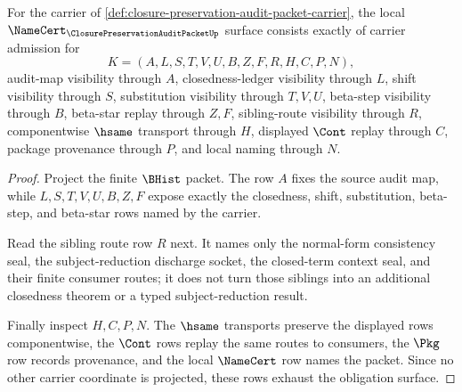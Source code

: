 \begin{theorem}
\label{thm:closure-preservation-audit-packet-namecert-obligations}
For the carrier of \autoref{def:closure-preservation-audit-packet-carrier}, the local $\NameCert_{\ClosurePreservationAuditPacketUp}$ surface consists exactly of carrier admission for
$$
K=(A,L,S,T,V,U,B,Z,F,R,H,C,P,N),
$$
audit-map visibility through $A$, closedness-ledger visibility through $L$, shift visibility through $S$, substitution visibility through $T,V,U$, beta-step visibility through $B$, beta-star replay through $Z,F$, sibling-route visibility through $R$, componentwise $\hsame$ transport through $H$, displayed $\Cont$ replay through $C$, package provenance through $P$, and local naming through $N$.
\end{theorem}
\begin{proof}
Project the finite $\BHist$ packet. The row $A$ fixes the source audit map, while $L,S,T,V,U,B,Z,F$ expose exactly the closedness, shift, substitution, beta-step, and beta-star rows named by the carrier.

Read the sibling route row $R$ next. It names only the normal-form consistency seal, the subject-reduction discharge socket, the closed-term context seal, and their finite consumer routes; it does not turn those siblings into an additional closedness theorem or a typed subject-reduction result.

Finally inspect $H,C,P,N$. The $\hsame$ transports preserve the displayed rows componentwise, the $\Cont$ rows replay the same routes to consumers, the $\Pkg$ row records provenance, and the local $\NameCert$ row names the packet. Since no other carrier coordinate is projected, these rows exhaust the obligation surface.
\end{proof}

